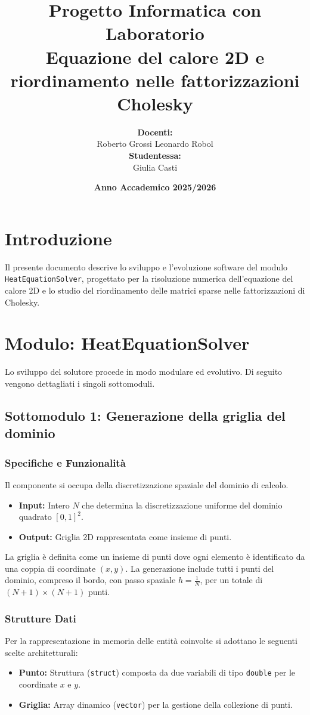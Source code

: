 \documentclass[twocolumn]{article}
\title{%
  \textbf{Progetto Informatica con Laboratorio} \\[0.5em]
  \Large Equazione del calore 2D e riordinamento nelle fattorizzazioni Cholesky
}
\author{%
  \textbf{Docenti:}\\[0.2em]
  Roberto Grossi \quad Leonardo Robol\\[0.5em]
  \textbf{Studentessa:}\\[0.2em]
  Giulia Casti
}
\date{\textbf{Anno Accademico 2025/2026}}
\begin{document}
\twocolumn[\maketitle]

\section{Introduzione}
Il presente documento descrive lo sviluppo e l'evoluzione software del modulo \texttt{HeatEquationSolver}, progettato per la risoluzione numerica dell'equazione del calore 2D e lo studio del riordinamento delle matrici sparse nelle fattorizzazioni di Cholesky.

\section{Modulo: HeatEquationSolver}
Lo sviluppo del solutore procede in modo modulare ed evolutivo. Di seguito vengono dettagliati i singoli sottomoduli.

\subsection{Sottomodulo 1: Generazione della griglia del dominio}

\subsubsection{Specifiche e Funzionalit\`a}
Il componente si occupa della discretizzazione spaziale del dominio di calcolo.
\begin{itemize}
    \item \textbf{Input:} Intero $N$ che determina la discretizzazione uniforme del dominio quadrato $[0, 1]^2$.
    \item \textbf{Output:} Griglia 2D rappresentata come insieme di punti.
\end{itemize}

La griglia \`e definita come un insieme di punti dove ogni elemento \`e identificato da una coppia di coordinate $(x, y)$. La generazione include tutti i punti del dominio, compreso il bordo, con passo spaziale $h = \frac{1}{N}$, per un totale di $(N+1) \times (N+1)$ punti.

\subsubsection{Strutture Dati}
Per la rappresentazione in memoria delle entit\`a coinvolte si adottano le seguenti scelte architetturali:
\begin{itemize}
    \item \textbf{Punto:} Struttura (\texttt{struct}) composta da due variabili di tipo \texttt{double} per le coordinate $x$ e $y$.
    \item \textbf{Griglia:} Array dinamico (\texttt{vector}) per la gestione della collezione di punti.
\end{itemize}
\end{document}
